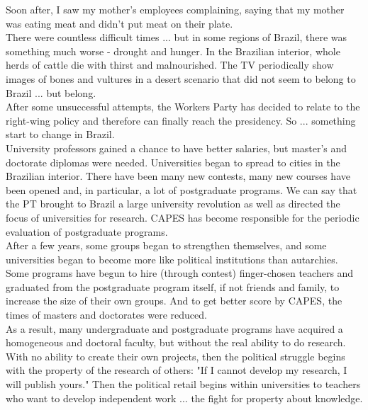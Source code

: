 \documentclass[11pt]{book}
\begin{document}
\noindent Soon after, I saw my mother's employees complaining, saying that my mother was eating meat and didn't put meat on their plate. \\

\noindent There were countless difficult times ... but in some regions of Brazil, there was something much worse - drought and hunger. In the Brazilian interior, whole herds of cattle die with thirst and malnourished. The TV periodically show images of bones and vultures in a desert scenario that did not seem to belong to Brazil ... but belong. \\

\noindent After some unsuccessful attempts, the Workers Party has decided to relate to the right-wing policy and therefore can finally reach the presidency. So ... something start to change in Brazil. \\

\noindent University professors gained a chance to have better salaries, but master's and doctorate diplomas were needed. Universities began to spread to cities in the Brazilian interior. There have been many new contests, many new courses have been opened and, in particular, a lot of postgraduate programs. We can say that the PT brought to Brazil a large university revolution as well as directed the focus of universities for research. CAPES has become responsible for the periodic evaluation of postgraduate programs. \\

\noindent After a few years, some groups began to strengthen themselves, and some universities began to become more like political institutions than autarchies. Some programs have begun to hire (through contest) finger-chosen teachers and graduated from the postgraduate program itself, if not friends and family, to increase the size of their own groups. And to get better score by CAPES, the times of masters and doctorates were reduced. \\ 

\noindent As a result, many undergraduate and postgraduate programs have acquired a homogeneous and doctoral faculty, but without the real ability to do research. \\

 \noindent With no ability to create their own projects, then the political struggle begins with the property of the research of others: "If I cannot develop my research, I will publish yours." Then the political retail begins within universities to teachers who want to develop independent work ... the fight for property about knowledge. \\
 
\end{document}
